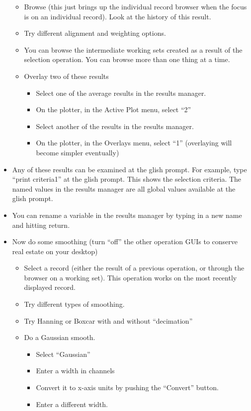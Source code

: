 \begin{itemize}
\begin{itemize}
\item Browse (this just brings up the individual record browser when the focus
is on an individual record).  Look at the history of this result.
\item Try different alignment and weighting options.
\item You can browse the intermediate working sets created as a result of
the selection operation.  You can browse more than one thing at a time.
\item Overlay two of these results
\begin{itemize}
\item Select one of the average results in the results manager.
\item On the plotter, in the Active Plot menu, select ``2''
\item Select another of the results in the results manager.
\item On the plotter, in the Overlays menu, select ``1'' 
(overlaying will become simpler eventually)
\end{itemize}
\end{itemize}
\item Any of these results can be examined at the glish prompt.
For example, type ``print criteria1'' at the glish prompt.  This shows
the selection criteria.  The named values in the results manager are all
global values available at the glish prompt.
\item You can rename a variable in the results manager by typing in a
new name and hitting return.
\item Now do some smoothing (turn ``off'' the other operation GUIs to
conserve real estate on your desktop)
\begin{itemize}
\item Select a record (either the result of a previous operation, or
through the browser on a working set).  This operation works on the
most recently displayed record.
\item Try different types of smoothing.
\item Try Hanning or Boxcar with and without ``decimation''
\item Do a Gaussian smooth.
\begin{itemize}
\item Select ``Gaussian''
\item Enter a width in channels
\item Convert it to x-axis units by pushing the ``Convert'' button.
\item Enter a different width.

\end{itemize}
\end{itemize}
\end{itemize}

